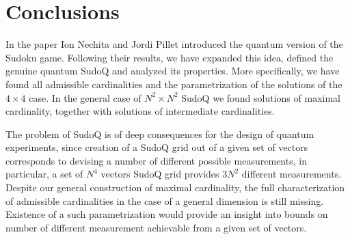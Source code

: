 \documentclass[aps,onecolumn,floatfix,superscriptaddress]{revtex4}
\begin{document}
\section{Conclusions}
In the paper \cite{Nechita2020SudoQA} Ion Nechita and Jordi Pillet introduced the quantum version of the Sudoku game. Following their results, we have expanded this idea, defined the genuine quantum SudoQ and analyzed its properties. More specifically, we have found all admissible cardinalities and the parametrization of the solutions of the $4\times 4$ case.
In the general case of $N^2 \times N^2$ SudoQ we found solutions of maximal cardinality, together with solutions of intermediate cardinalities.

The problem of SudoQ is of deep consequences for the design of quantum experiments, since creation of a SudoQ grid out of a given set of vectors corresponds to devising a number of different possible measurements, in particular, a set of $N^4$ vectors SudoQ grid provides $3N^2$ different measurements.
Despite our general construction of maximal cardinality, the full characterization of admissible cardinalities in the case of a general dimension is still missing. 
Existence of a such parametrization would provide an insight into bounds on number of different measurement achievable from a given set of vectors.



\printbibliography
\end{document}
